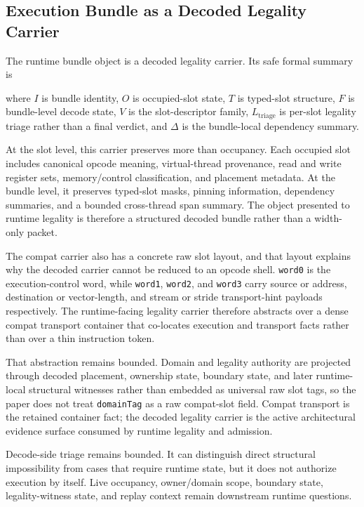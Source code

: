 \documentclass[twocolumn]{article}
\begin{document}
\subsection{Execution Bundle as a Decoded Legality Carrier}

The runtime bundle object is a decoded legality carrier. Its safe formal summary is


where \(I\) is bundle identity, \(O\) is occupied-slot state, \(T\) is typed-slot structure, \(F\) is bundle-level decode state, \(V\) is the slot-descriptor family, \(L_{\mathrm{triage}}\) is per-slot legality triage rather than a final verdict, and \(\Delta\) is the bundle-local dependency summary.

At the slot level, this carrier preserves more than occupancy. Each occupied slot includes canonical opcode meaning, virtual-thread provenance, read and write register sets, memory/control classification, and placement metadata. At the bundle level, it preserves typed-slot masks, pinning information, dependency summaries, and a bounded cross-thread span summary. The object presented to runtime legality is therefore a structured decoded bundle rather than a width-only packet.

The compat carrier also has a concrete raw slot layout, and that layout explains why the decoded carrier cannot be reduced to an opcode shell. \texttt{word0} is the execution-control word, while \texttt{word1}, \texttt{word2}, and \texttt{word3} carry source or address, destination or vector-length, and stream or stride transport-hint payloads respectively. The runtime-facing legality carrier therefore abstracts over a dense compat transport container that co-locates execution and transport facts rather than over a thin instruction token.

That abstraction remains bounded. Domain and legality authority are projected through decoded placement, ownership state, boundary state, and later runtime-local structural witnesses rather than embedded as universal raw slot tags, so the paper does not treat \texttt{domainTag} as a raw compat-slot field. Compat transport is the retained container fact; the decoded legality carrier is the active architectural evidence surface consumed by runtime legality and admission.

Decode-side triage remains bounded. It can distinguish direct structural impossibility from cases that require runtime state, but it does not authorize execution by itself. Live occupancy, owner/domain scope, boundary state, legality-witness state, and replay context remain downstream runtime questions.
\end{document}
